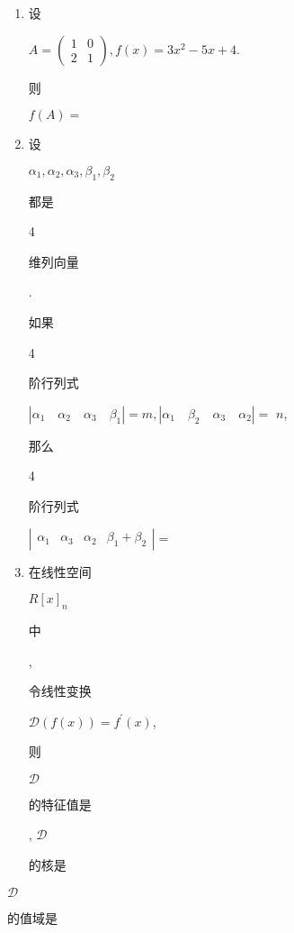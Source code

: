 \documentclass[10pt]{article}
\begin{document}
\begin{enumerate}
  \item \begin{CJK}{UTF8}{mj}设\end{CJK} $A=\left(\begin{array}{ll}1 & 0 \\ 2 & 1\end{array}\right), f(x)=3 x^{2}-5 x+4$. \begin{CJK}{UTF8}{mj}则\end{CJK} $f(A)=$

  \item \begin{CJK}{UTF8}{mj}设\end{CJK} $\alpha_{1}, \alpha_{2}, \alpha_{3}, \beta_{1}, \beta_{2}$ \begin{CJK}{UTF8}{mj}都是\end{CJK} 4 \begin{CJK}{UTF8}{mj}维列向量\end{CJK}. \begin{CJK}{UTF8}{mj}如果\end{CJK} 4 \begin{CJK}{UTF8}{mj}阶行列式\end{CJK} $\left|\alpha_{1} \quad \alpha_{2} \quad \alpha_{3} \quad \beta_{1}\right|=m,\left|\alpha_{1} \quad \beta_{2} \quad \alpha_{3} \quad \alpha_{2}\right|=$ $n$, \begin{CJK}{UTF8}{mj}那么\end{CJK} 4 \begin{CJK}{UTF8}{mj}阶行列式\end{CJK} $\left|\begin{array}{llll}\alpha_{1} & \alpha_{3} & \alpha_{2} & \beta_{1}+\beta_{2}\end{array}\right|=$

  \item \begin{CJK}{UTF8}{mj}在线性空间\end{CJK} $R[x]_{n}$ \begin{CJK}{UTF8}{mj}中\end{CJK}, \begin{CJK}{UTF8}{mj}令线性变换\end{CJK} $\mathscr{D}(f(x))=f^{\prime}(x)$, \begin{CJK}{UTF8}{mj}则\end{CJK} $\mathscr{D}$ \begin{CJK}{UTF8}{mj}的特征值是\end{CJK} , $\mathscr{D}$ \begin{CJK}{UTF8}{mj}的核是\end{CJK}

\end{enumerate}
$\mathscr{D}$ \begin{CJK}{UTF8}{mj}的值域是\end{CJK}
\end{document}
